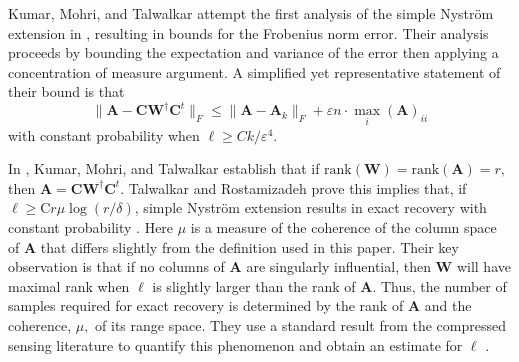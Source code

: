 \documentclass[11pt,letterpaper,twoside,reqno,nosumlimits]{amsart}
\newcommand{\mat}[1]{\ensuremath{\bm{#1}}}
\theoremstyle{remark}
\begin{document}
Kumar, Mohri, and Talwalkar attempt the first analysis of the simple Nystr\"om extension in \cite{KMT09}, resulting in bounds for the Frobenius norm error. Their analysis proceeds by bounding the expectation and variance of the error then applying a concentration of measure argument. A simplified yet representative statement of their bound is that 
\[
 \|\mat{A} - \mat{C}\mat{W}^\dagger\mat{C}^t \|_F \leq \|\mat{A} - \mat{A}_k\|_F + \varepsilon n \cdot \max_i {(\mat{A})_{ii}}
\]
with constant probability when $\ell \geq Ck/\varepsilon^4.$ 

In \cite{KMT09a}, Kumar, Mohri, and Talwalkar establish that if $\text{rank}(\mat{W})= \text{rank}(\mat{A}) = r,$ then $\mat{A} = \mat{C}\mat{W}^\dagger \mat{C}^t.$ Talwalkar and Rostamizadeh prove this implies that, if $\ell \geq \mathrm{C} r \mu \log(r/\delta)$, simple Nystr\"om extension results in exact recovery with constant probability \cite{TR10}. Here $\mu$ is a measure of the coherence of the column space of $\mat{A}$ that differs slightly from the definition used in this paper. Their key observation is that if no columns of $\mat{A}$ are singularly influential, then $\mat{W}$ will have maximal rank when $\ell$ is slightly larger than the rank of $\mat{A}$. Thus, the number of samples required for exact recovery is determined by the rank of $\mat{A}$ and the coherence, $\mu,$ of its range space. They use a standard result from the compressed sensing literature to quantify this phenomenon and obtain an estimate for $\ell$ \cite{CR07}.
\end{document}
